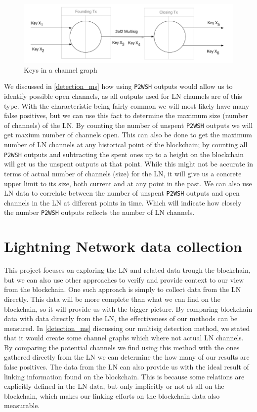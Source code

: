 \begin{figure}[h]
    \centering
    \includegraphics[width=14cm]{figures/keys_subgraph.png}
    \caption{Keys in a channel graph}
    \label{fig:keys_graphs}
\end{figure}

We discussed in \cref{detection_ms} how using {\tt P2WSH} outputs would allow us to identify possible open channels, as all outputs used for LN channels are of this type. With the characteristic being fairly common we will most likely have many false positives, but we can use this fact to determine the maximum size (number of channels) of the LN.
By counting the number of unspent {\tt P2WSH} outputs we will get maxium number of channels open. This can also be done to get the maximum number of LN channels at any historical point of the blockchain;
by counting all {\tt P2WSH} outputs and subtracting the spent ones up to a height on the blockchain will get us the unspent outputs at that point.
While this might not be accurate in terms of actual number of channels (size) for the LN, it will give us a concrete upper limit to its size, both current and at any point in the past.
We can also use LN data to correlate between the number of unspent {\tt P2WSH} outputs and open channels in the LN at different points in time. Which will indicate how closely the number {\tt P2WSH} outputs reflects the number of LN channels.

\section{Lightning Network data collection}
\label{sec:ln_analysis}

This project focuses on exploring the LN and related data trough the blockchain, but we can also use other approaches to verify and provide context to our view from the blockchain.
One such approach is simply to collect data from the LN directly.
This data will be more complete than what we can find on the blockchain, so it will provide us with the bigger picture. By comparing blockchain data with data directly from the LN, the effectiveness of our methods can be measured. In \cref{detection_ms} discussing our multisig detection method, we stated that it would create some channel graphs which where not actual LN channels. By comparing the potential channels we find using this method with the ones gathered directly from the LN we can determine the how many of our results are false positives.
The data from the LN can also provide us with the ideal result of linking information found on the blockchain. This is because some relations are explicitly defined in the LN data, but only implicitly or not at all on the blockchain, which makes our linking efforts on the blockchain data also measurable.
\\


